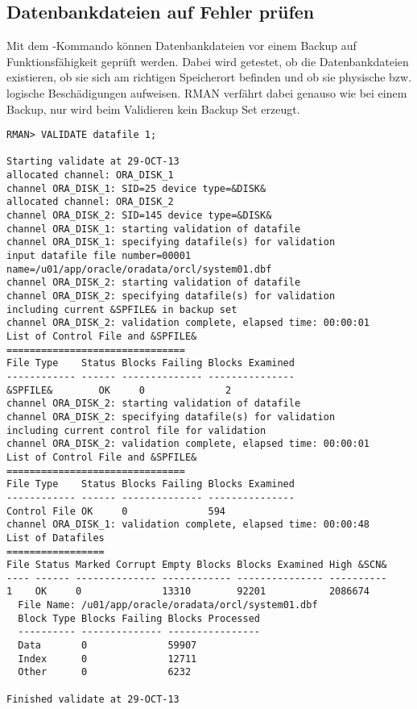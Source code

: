       \subsection{Datenbankdateien auf Fehler pr\"ufen}
        Mit dem -Kommando k\"onnen Datenbankdateien vor einem Backup auf Funktionsf\"ahigkeit gepr\"uft werden. Dabei wird getestet, ob die Datenbankdateien existieren, ob sie sich am richtigen Speicherort befinden und ob sie physische bzw. logische Besch\"adigungen aufweisen. RMAN verf\"ahrt dabei genauso wie bei einem Backup, nur wird beim Validieren kein Backup Set erzeugt.
\clearpage
        \begin{lstlisting}[caption={Eine Datendatei validieren},label=admin1400,language=rman]
RMAN> VALIDATE datafile 1;

Starting validate at 29-OCT-13
allocated channel: ORA_DISK_1
channel ORA_DISK_1: SID=25 device type=&DISK&
allocated channel: ORA_DISK_2
channel ORA_DISK_2: SID=145 device type=&DISK&
channel ORA_DISK_1: starting validation of datafile
channel ORA_DISK_1: specifying datafile(s) for validation
input datafile file number=00001 name=/u01/app/oracle/oradata/orcl/system01.dbf
channel ORA_DISK_2: starting validation of datafile
channel ORA_DISK_2: specifying datafile(s) for validation
including current &SPFILE& in backup set
channel ORA_DISK_2: validation complete, elapsed time: 00:00:01
List of Control File and &SPFILE&
===============================
File Type    Status Blocks Failing Blocks Examined
------------ ------ -------------- ---------------
&SPFILE&        OK     0              2
channel ORA_DISK_2: starting validation of datafile
channel ORA_DISK_2: specifying datafile(s) for validation
including current control file for validation
channel ORA_DISK_2: validation complete, elapsed time: 00:00:01
List of Control File and &SPFILE&
===============================
File Type    Status Blocks Failing Blocks Examined
------------ ------ -------------- ---------------
Control File OK     0              594
channel ORA_DISK_1: validation complete, elapsed time: 00:00:48
List of Datafiles
=================
File Status Marked Corrupt Empty Blocks Blocks Examined High &SCN&
---- ------ -------------- ------------ --------------- ----------
1    OK     0              13310        92201           2086674
  File Name: /u01/app/oracle/oradata/orcl/system01.dbf
  Block Type Blocks Failing Blocks Processed
  ---------- -------------- ----------------
  Data       0              59907
  Index      0              12711
  Other      0              6232

Finished validate at 29-OCT-13
        \end{lstlisting}

